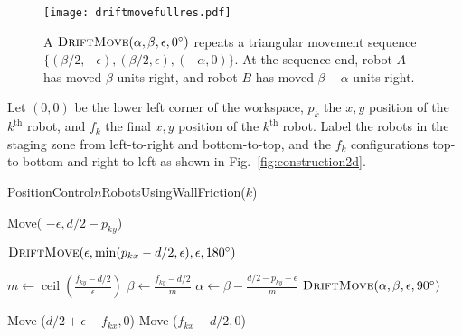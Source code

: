 \begin{figure}
\begin{center}
	\texttt{[image: driftmovefullres.pdf]}
\end{center}
\vspace{-1em}
\caption{\label{fig:driftmove}
A  $\text{\sc DriftMove}(\alpha, \beta, \epsilon,0^\circ)$ repeats a triangular movement sequence $\{ (\beta/2,-\epsilon),(\beta/2,\epsilon),(-\alpha,0)\}$. At the sequence end, robot $A$ has moved $\beta$ units right, and robot $B$ has moved $\beta-\alpha$ units right.}
\vspace{-1em}
\end{figure}

Let $(0,0)$ be the lower left corner of the workspace, $p_k$ the $x,y$ position of the $k^{\text{th}}$ robot, and $f_k$ the final $x,y$ position of the $k^{\text{th}}$ robot. Label the robots in the staging zone from left-to-right and bottom-to-top, and the $f_k$ configurations top-to-bottom and right-to-left as shown in Fig.~\ref{fig:construction2d}.

\begin{algorithm}
\caption{PositionControl$n$RobotsUsingWallFriction($k$)}\label{alg:PosControlNRobots}
\begin{algorithmic}[1]
\State Move( $-\epsilon, d/2-p_{ky}$) %


\State $\text{\sc DriftMove}(\epsilon, \min(p_{kx} - d/2,\epsilon), \epsilon,180^\circ)$    %
\EndWhile

\State $m \gets \operatorname{ceil}(\frac{f_{ky}-d/2}{\epsilon})$
\State $\beta \gets \frac{f_{ky}-d/2}{m}$
\State $\alpha \gets \beta - \frac{d/2 - p_{ky}-\epsilon}{m}$
\State $\text{\sc DriftMove}(\alpha, \beta, \epsilon,90^\circ)$    %
\EndFor

\State Move ($d/2+\epsilon-f_{kx}, 0$)  %
\State Move ($f_{kx}-d/2, 0$)  

\end{algorithmic}
\end{algorithm}


